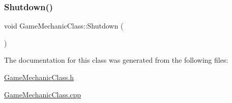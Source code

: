 \subsubsection{\texorpdfstring{Shutdown()}{Shutdown()}}
{\footnotesize\ttfamily void Game\+Mechanic\+Class\+::\+Shutdown (\begin{DoxyParamCaption}{ }\end{DoxyParamCaption})}



The documentation for this class was generated from the following files\+:\begin{DoxyCompactItemize}
\item 
\hyperlink{_game_mechanic_class_8h}{Game\+Mechanic\+Class.\+h}\item 
\hyperlink{_game_mechanic_class_8cpp}{Game\+Mechanic\+Class.\+cpp}\end{DoxyCompactItemize}
